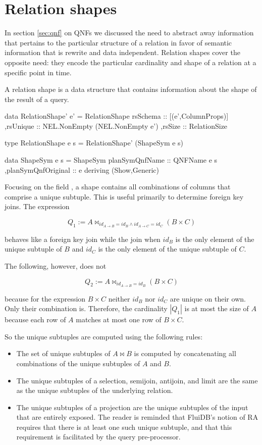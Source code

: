 \section{Relation shapes}
\label{sec:relation_shapes}

In section \ref{sec:qnf} on QNFs we discussed the need to abstract away
information that pertains to the particular structure of a relation in
favor of semantic information that is rewrite and data
independent. Relation shapes cover the opposite need: they encode the
particular cardinality and shape of a relation at a specific point in
time.

A relation shape is a data structure that contains information about
the shape of the result of a query.

\begin{haskellcode}
  data RelationShape' e' =
    RelationShape
    { rsSchema :: [(e',ColumnProps)]
      ,rsUnique :: NEL.NonEmpty (NEL.NonEmpty e')
      ,rsSize :: RelationSize
    }

  type RelationShape e s = RelationShape' (ShapeSym e s)

  data ShapeSym e s =
    ShapeSym { planSymQnfName :: QNFName e s
      ,planSymQnfOriginal :: e
    }
    deriving (Show,Generic)
\end{haskellcode}

Focusing on the field , a shape contains
all combinations of columns that comprise a unique
subtuple.  This is useful primarily to determine foreign key
joins. The expression

\[Q_1 := A \Join_{id_{A \to B} = id_B \land id_{A \to C} = id_C} (B \times C)\]

behaves like a foreign key join while the join when \(id_B\) is the
only element of the unique subtuple of \(B\) and \(id_C\) is the only
element of the unique subtuple of \(C\).

The following, however, does not

\[Q_2 := A \Join_{id_{A \to B} = id_B} (B \times C)\]

\noindent because for the expression \(B \times C\) neither \(id_B\) nor
\(id_C\) are unique on their own.  Only their combination
is. Therefore, the cardinality \(|Q_1|\) is at most the size of \(A\)
because each row of \(A\) matches at most one row of \(B \times C\).

So the unique subtuples are computed using the following rules:

\begin{itemize}
\item The set of unique subtuples of \(A \Join B\) is
  computed by concatenating all combinations of the unique subtuples
  of \(A\) and \(B\).
\item The unique subtuples of a selection, semijoin, antijoin, and limit are the same as the unique
  subtuples of the underlying relation.
\item The unique subtuples of a projection are the unique subtuples of
  the input that are entirely exposed.  The reader is reminded that
  FluiDB's notion of RA requires that there is at least one such
  unique subtuple, and that this requirement is facilitated by the
  query pre-processor.
\end{itemize}

